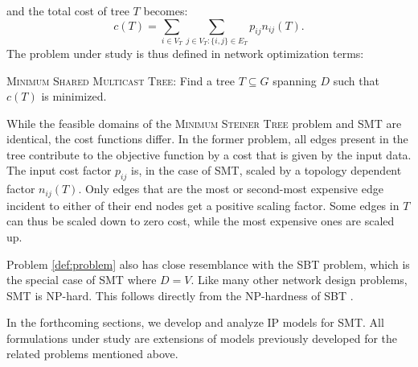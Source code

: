 \noindent
and the total cost of tree $T$ becomes:
$$
  c(T) = \sum_{i\in V_T}\sum_{j\in V_T:\{i,j\}\in E_T}p_{ij}n_{ij}(T).
$$ 
The problem under study is thus defined in network optimization terms:

\begin{problem}
\label{def:problem}
\textsc{Minimum Shared Multicast Tree}: Find a tree $T\subseteq G$ spanning $D$ such that $c(T)$ is minimized.
\end{problem}

While the feasible domains of the \textsc{Minimum Steiner Tree} problem and SMT are identical,
the cost functions differ.
In the former problem, all edges present in the tree contribute to the objective function by a cost that is given by the input data.
The input cost factor $p_{ij}$ is, in the case of SMT, scaled by a topology dependent factor $n_{ij}(T)$.
Only edges that are the most or second-most expensive edge incident to either of their end nodes get a positive scaling factor.
Some edges in $T$ can thus be scaled down to zero cost, while the most expensive ones are scaled up.

Problem \ref{def:problem} also has close resemblance with the SBT problem, which is the special case of SMT where $D=V$.
Like many other network design problems, SMT is NP-hard.
This follows directly from the NP-hardness of SBT \citep{Papadimitriou06SBT}.


In the forthcoming sections, we develop and analyze IP models for SMT.
All formulations under study are extensions of models previously developed for the related problems mentioned above.
